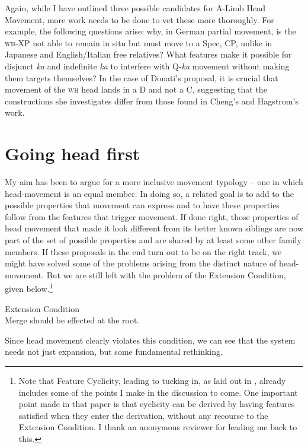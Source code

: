 \documentclass[output=paper,colorlinks,citecolor=brown,
]{langscibook}
\begin{document}
Again, while I have outlined three possible candidates for \=A-Limb Head Movement, more work needs to be done to vet these more thoroughly.  For example, the following questions arise: why, in German partial movement, is the \textsc{wh}-XP not able to remain in situ but must move to a Spec, CP, unlike in Japanese and English/Italian free relatives? What features make it possible for disjunct \textit{ka} and indefinite \textit{ka} to interfere with Q-\textit{ka} movement without making them targets themselves?  In the case of Donati's proposal, it is crucial that movement of the \textsc{wh} head lands in a D and not a C, suggesting that the constructions she investigates differ from those found in Cheng's and Hagstrom's work.

\section{Going head first}

My aim has been to argue for a more inclusive movement typology -- one in which head-movement is an equal member.  In doing so, a related goal is to add to the possible properties that movement can express and to have these properties follow from the features that trigger movement.  If done right, those properties of head movement that made it look different from its better known siblings are now part of the set of possible properties and are shared by at least some other family members.  If these proposals in the end turn out to be on the right track, we might have solved  some of the problems arising from the distinct nature of head-movement.  But we are still left with the problem of the Extension Condition, given below.\footnote{Note that Feature Cyclicity, leading to tucking in, as laid out in \citet{Richards:1997a}, already includes some of the points I make in the discussion to come.  One important point made in that paper \citep[57]{Richards:1997a} is that cyclicity can be derived by having features satisfied when they enter the derivation, without any recourse to the Extension Condition.  I thank an anonymous reviewer for leading me back to this.} 

\ea Extension Condition \citep{Chomsky:1995}\\
Merge should be effected at the root.
\z

Since head movement clearly violates this condition, we can see that the system needs not just expansion, but some fundamental rethinking.  
\end{document}
